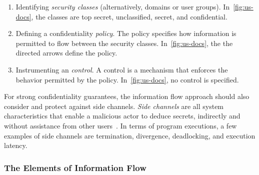 \begin{enumerate} 

\item Identifying \emph{security classes} (alternatively, domains or user groups).
In~\autoref{fig:us-docs}, the classes are top secret, unclassified, secret, and confidential.

\item Defining a confidentiality \emph{policy}.
The policy specifies how information is permitted to flow between the security classes.
In~\autoref{fig:us-docs}, the the directed arrows define the policy.

\item Instrumenting an \emph{control}. 
A control is a mechanism that enforces the behavior permitted by the policy.
In~\autoref{fig:us-docs}, no control is specified.

\end{enumerate}

For strong confidentiality guarantees, the information flow approach should also consider and protect against side channels.
\emph{Side channels} are all system characteristics that enable a malicious actor to deduce secrets,
indirectly and without assistance from other users~\cite[p. 280]{bishop2003}.
In terms of program executions, a few examples of side channels are termination, divergence, deadlocking, and execution latency.
 
\subsubsection{The Elements of Information Flow}
\label{if-elements}

